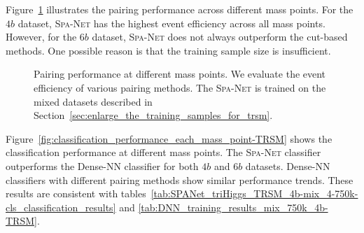 \documentclass[12pt]{article}
\begin{document}
        Figure~\ref{fig:pairing_performance_each_mass_point-TRSM-750k} illustrates the pairing performance across different mass points. For the $4b$ dataset, \textsc{Spa-Net} has the highest event efficiency across all mass points. However, for the $6b$ dataset, \textsc{Spa-Net} does not always outperform the cut-based methods. One possible reason is that the training sample size is insufficient.
        \begin{figure}[htpb]
            \centering
            \caption{Pairing performance at different mass points. We evaluate the event efficiency of various pairing methods. The \textsc{Spa-Net} is trained on the mixed datasets described in Section~\ref{sec:enlarge_the_training_samples_for_trsm}.}  
            \label{fig:pairing_performance_each_mass_point-TRSM-750k}  
        \end{figure}

        Figure~\ref{fig:classification_performance_each_mass_point-TRSM} shows the classification performance at different mass points. The \textsc{Spa-Net} classifier outperforms the Dense-NN classifier for both $4b$ and $6b$ datasets. Dense-NN classifiers with different pairing methods show similar performance trends. These results are consistent with tables~\ref{tab:SPANet_triHiggs_TRSM_4b-mix_4-750k-cls_classification_results} and \ref{tab:DNN_training_results_mix_750k_4b-TRSM}.  
\end{document}
